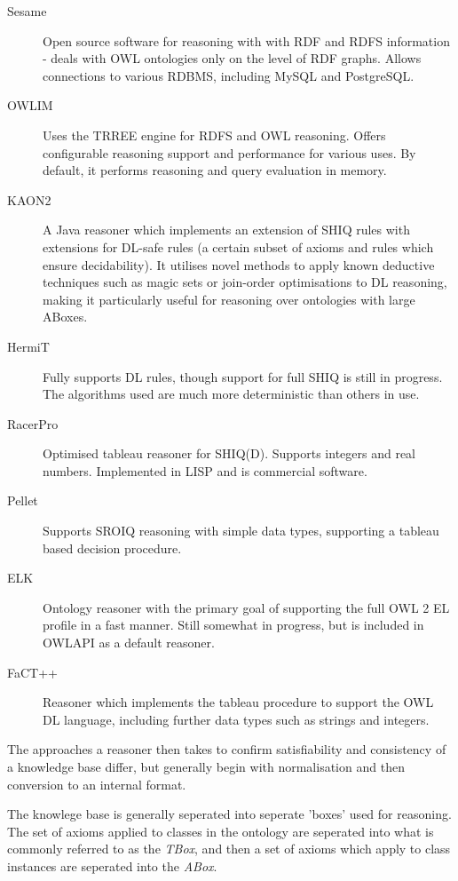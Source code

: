 \documentclass{article}
\begin{document}
\begin{description}
    \item[Sesame] Open source software for reasoning with with RDF and RDFS
    information\cite{sesame} - deals with OWL ontologies only on the level of RDF graphs.
    Allows connections to various RDBMS, including MySQL and PostgreSQL.
    \item[OWLIM] Uses the TRREE engine for RDFS and OWL reasoning. Offers
    configurable reasoning support and performance for various uses. By default,
    it performs reasoning and query evaluation in memory.\cite{owlim}
    \item[KAON2] A Java reasoner which implements an extension of SHIQ rules with
    extensions for DL-safe rules (a certain subset of axioms and rules which
    ensure decidability).\cite{kaon} It utilises novel methods to apply known
    deductive techniques such as magic sets or join-order optimisations
    to DL reasoning, making it particularly useful for reasoning over ontologies
    with large ABoxes.\cite{kaonabox}
    \item[HermiT] Fully supports DL rules, though support for full SHIQ is still
    in progress. The algorithms used are much more deterministic than others in
    use.\cite{hermit}
    \item[RacerPro] Optimised tableau reasoner for SHIQ(D). Supports integers
    and real numbers. Implemented in LISP and is commercial
    software.\cite{racerpro}
    \item[Pellet] Supports SROIQ reasoning with simple data types, supporting a
    tableau based decision procedure.\cite{pellet}
    \item[ELK] Ontology reasoner with the primary goal of supporting the full
    OWL 2 EL profile in a fast manner. Still somewhat in progress, but is included
    in OWLAPI as a default reasoner.\cite{elk}
    \item[FaCT++] Reasoner which implements the tableau procedure to support the
    OWL DL language, including further data types such as strings and
    integers.\cite{fact}
\end{description}

The approaches a reasoner then takes to confirm satisfiability and consistency of
a knowledge base differ, but generally begin with normalisation and then
conversion to an internal format. 

The knowlege base is generally seperated into seperate 'boxes' used for
reasoning. The set of axioms applied to classes in the ontology are seperated
into what is commonly referred to as the \emph{TBox}, and then a set of axioms
which apply to class instances are seperated into the \emph{ABox}. 
\end{document}
